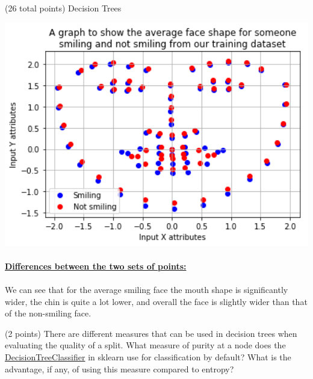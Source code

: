 \documentclass[12pt]{article}
\begin{document}
\begin{question}{(26 total points) Decision Trees}
\begin{subquestion}
\begin{answerbox}{36em}
\includegraphics [width=1\textwidth]{images/q3b-graph.png}\\
\\
\large{\textbf{\underline{Differences between the two sets of points:}}}\\
\\
\normalsize{
We can see that for the average smiling face the mouth shape is significantly wider, the chin is quite a lot lower, and overall the face is slightly wider than that of the non-smiling face.
}
\end{answerbox}



\end{subquestion}


%
%
\begin{subquestion}{(2 points) 
There are different measures that can be used in decision trees when evaluating the quality of a split. 
What measure of purity at a node does the \href{https://scikit-learn.org/0.19/modules/generated/sklearn.tree.DecisionTreeClassifier.html}{DecisionTreeClassifier} in sklearn use for classification by default? 
What is the advantage, if any, of using this measure compared to entropy? 
}



\end{subquestion}
\end{question}
\end{document}
